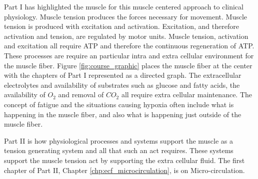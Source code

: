 Part I has highlighted the muscle for this muscle centered approach to clinical physiology. Muscle tension produces the forces necessary for movement. Muscle tension is produced with excitation and activation. Excitation, and therefore activation and tension, are regulated by motor units. Muscle tension, activation and excitation all require ATP and therefore the continuous regeneration of ATP. These processes are require an particular intra and extra cellular environment for the muscle fiber. Figure \ref{fig:course_graphic} places the muscle fiber at the center with the chapters of Part I represented as a directed graph. The extracellular electrolytes and availability of substrates such as glucose and fatty acids, the availability of $O_2$ and removal of $CO_2$ all require extra cellular maintenance. The concept of fatigue and the situations causing hypoxia often include what is happening in the muscle fiber, and also what is happening just outside of the muscle fiber. 



Part II is how physiological processes and systems support the muscle as a tension generating system and all that such an act requires. These systems support the muscle tension act by supporting the extra cellular fluid. The first chapter of Part II, Chapter \ref{chp:ecf_microcirculation}, is on Micro-circulation. 

\printbibliography[heading=subbibintoc]